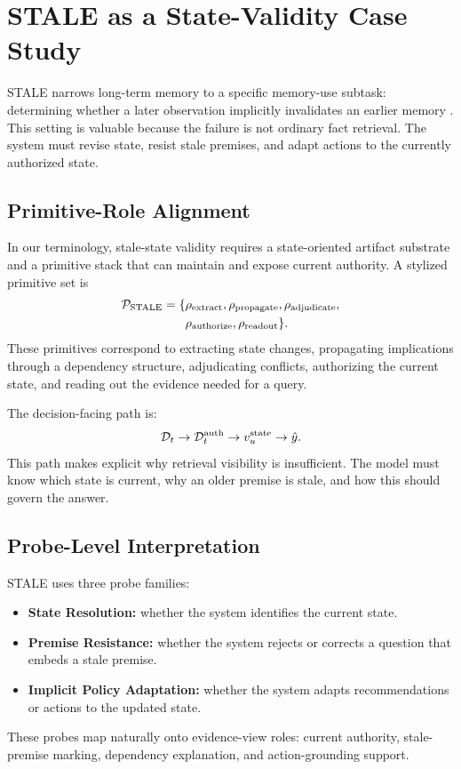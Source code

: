 \section{STALE as a State-Validity Case Study}
\label{sec:stale}

STALE narrows long-term memory to a specific memory-use subtask: determining whether a later observation implicitly invalidates an earlier memory \cite{chao2026stalellmagentsknow}.
This setting is valuable because the failure is not ordinary fact retrieval.
The system must revise state, resist stale premises, and adapt actions to the currently authorized state.

\subsection{Primitive-Role Alignment}
\label{subsec:stale-alignment}

In our terminology, stale-state validity requires a state-oriented artifact substrate and a primitive stack that can maintain and expose current authority.
A stylized primitive set is
\begin{align}
\mathcal{P}_{\mathrm{STALE}}=\{&
\rho_{\mathrm{extract}}, \rho_{\mathrm{propagate}},
\rho_{\mathrm{adjudicate}}, \nonumber\\
&\rho_{\mathrm{authorize}}, \rho_{\mathrm{readout}}\}.
\end{align}
These primitives correspond to extracting state changes, propagating implications through a dependency structure, adjudicating conflicts, authorizing the current state, and reading out the evidence needed for a query.

The decision-facing path is:
\begin{equation}
\mathcal{D}_t \rightarrow \mathcal{D}_t^{\mathrm{auth}} \rightarrow v_u^{\mathrm{state}} \rightarrow \hat{y}.
\end{equation}
This path makes explicit why retrieval visibility is insufficient.
The model must know which state is current, why an older premise is stale, and how this should govern the answer.

\subsection{Probe-Level Interpretation}
\label{subsec:stale-probes}

STALE uses three probe families:
\begin{itemize}[leftmargin=*]
    \item \textbf{State Resolution:} whether the system identifies the current state.
    \item \textbf{Premise Resistance:} whether the system rejects or corrects a question that embeds a stale premise.
    \item \textbf{Implicit Policy Adaptation:} whether the system adapts recommendations or actions to the updated state.
\end{itemize}
These probes map naturally onto evidence-view roles: current authority, stale-premise marking, dependency explanation, and action-grounding support.

